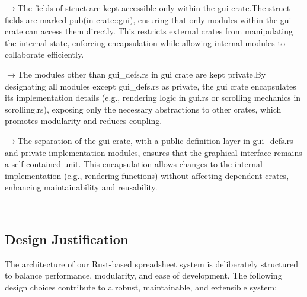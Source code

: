\documentclass{article}
\begin{document}
    $\rightarrow$The fields of struct are kept accessible only within the gui crate.The struct fields are marked pub(in crate::gui), ensuring that only modules within the gui crate can access them directly. This restricts external crates from manipulating the internal state, enforcing encapsulation while allowing internal modules to collaborate efficiently.


    
    $\rightarrow$The modules other than gui\_defs.rs in gui crate are kept private.By designating all modules except gui\_defs.rs as private, the gui crate encapsulates its implementation details (e.g., rendering logic in gui.rs or scrolling mechanics in scrolling.rs), exposing only the necessary abstractions to other crates, which promotes modularity and reduces coupling.


    
    $\rightarrow$The separation of the gui crate, with a public definition layer in gui\_defs.rs and private implementation modules, ensures that the graphical interface remains a self-contained unit. This encapsulation allows changes to the internal implementation (e.g., rendering functions) without affecting dependent crates, enhancing maintainability and reusability.
    
\\
\subsection{Design Justification}
\label{sec:justification}

The architecture of our Rust-based spreadsheet system is deliberately structured to balance performance, modularity, and ease of development. The following design choices contribute to a robust, maintainable, and extensible system:
\end{document}
